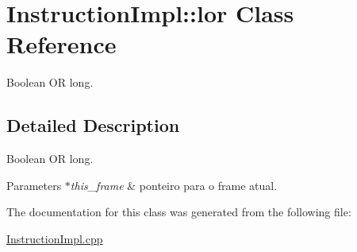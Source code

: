 \hypertarget{class_instruction_impl_1_1lor}{}\section{Instruction\+Impl\+:\+:lor Class Reference}
\label{class_instruction_impl_1_1lor}


Boolean OR long.  




\subsection{Detailed Description}
Boolean OR long. 


\begin{DoxyParams}{Parameters}
{\em $\ast$this\+\_\+frame} & ponteiro para o frame atual.  \\
\hline
\end{DoxyParams}


The documentation for this class was generated from the following file\+:\begin{DoxyCompactItemize}
\item 
\hyperlink{_instruction_impl_8cpp}{Instruction\+Impl.\+cpp}\end{DoxyCompactItemize}
